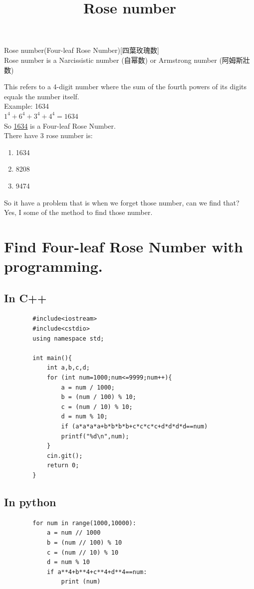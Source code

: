 \documentclass[12pt,a4paper,]{ctexart}
\title{Rose number}
\author{}
\date{}
\begin{document}
	\maketitle
	\begin{center}
		Rose number(Four-leaf Rose Number)[四葉玫瑰数]\\
		Rose number is a Narcissistic number (自幂数) or Armstrong number (阿姆斯壯数)
	\end{center}
	This refers to a 4-digit number where the sum of the fourth powers of its digits equals the number itself.\\
	Example: 1634\\
	$1^4+6^4+3^4+4^4 = 1634$\\
	So \underline{1634} is a Four-leaf Rose Number.\\
	There have 3 rose number is:
	\begin{enumerate}
		\item 1634
		\item 8208
		\item 9474
	\end{enumerate}
	\newpage
	So it have a problem that is when we forget those number, can we find that?\\
	Yes, I some of the method to find those number.\\
	\section {Find Four-leaf Rose Number with programming.}
	\subsection{In C++}
	\begin{lstlisting}
		#include<iostream>
		#include<cstdio>
		using namespace std;
		
		int main(){
			int a,b,c,d;
			for (int num=1000;num<=9999;num++){
				a = num / 1000;
				b = (num / 100) % 10;
				c = (num / 10) % 10;
				d = num % 10;
				if (a*a*a*a+b*b*b*b+c*c*c*c+d*d*d*d==num)
				printf("%d\n",num);
			}
			cin.git();
			return 0;
		}
	\end{lstlisting}
	\subsection{In python}
	\begin{lstlisting}
		for num in range(1000,10000):
			a = num // 1000
			b = (num // 100) % 10
			c = (num // 10) % 10
			d = num % 10
			if a**4+b**4+c**4+d**4==num:
				print (num)
	\end{lstlisting}
\end{document}
